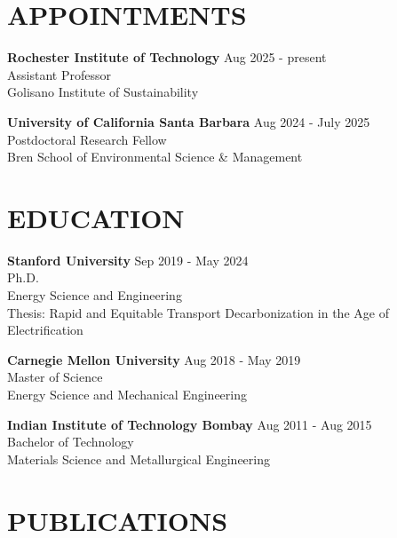 \documentclass[centered, 11pt]{res}
\begin{document}
\begin{resume}
\section{APPOINTMENTS}
\textbf{Rochester Institute of Technology} \hfill Aug 2025 - present\\
Assistant Professor\\
Golisano Institute of Sustainability
\par
\textbf{University of California Santa Barbara} \hfill Aug 2024 - July 2025\\
Postdoctoral Research Fellow\\
Bren School of Environmental Science \& Management
\par
\section{EDUCATION}
\textbf{Stanford University} \hfill Sep 2019 - May 2024\\
Ph.D.\\
Energy Science and Engineering\\
Thesis: Rapid and Equitable Transport Decarbonization in the Age of Electrification
\par
\textbf{Carnegie Mellon University} \hfill Aug 2018 - May 2019\\
Master of Science \\
Energy Science and Mechanical Engineering
\par
\textbf{Indian Institute of Technology Bombay} \hfill Aug 2011 - Aug 2015\\
Bachelor of Technology \\
Materials Science and Metallurgical Engineering
\section{PUBLICATIONS}

\end{resume}
\end{document}
